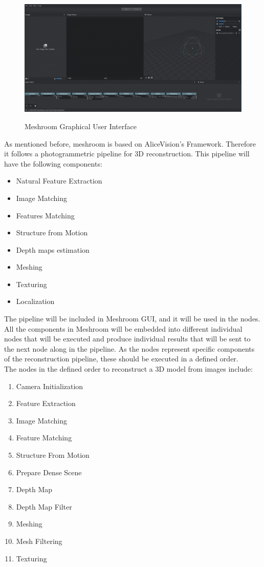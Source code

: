 \documentclass[12pt]{report}
\begin{document}
\begin{figure}[h]
  \centering
  \includegraphics[width=1\textwidth]{meshroom_gui.jpg}
  \caption{Meshroom Graphical User Interface}\cite[]{meshroom}
  \label{fig:meshroom_gui} 
\end{figure}

\newpage
As mentioned before, meshroom is based on AliceVision's Framework. Therefore it follows a photogrammetric pipeline for 3D reconstruction. 
This pipeline will have the following components:
\begin{itemize}
  \itemsep0em 
  \item Natural Feature Extraction
  \item Image Matching
  \item Features Matching
  \item Structure from Motion
  \item Depth maps estimation
  \item Meshing
  \item Texturing
  \item Localization
\end{itemize}

The pipeline will be included in Meshroom GUI, and it will be used in the nodes. All the components in Meshroom will be embedded into different individual nodes that will be executed and produce individual results that will be sent to the next node along in the pipeline.
As the nodes represent specific components of the reconstruction pipeline, these should be executed in a defined order.\\
The nodes in the defined order to reconstruct a 3D model from images include:
\begin{enumerate}
  \itemsep0em 
  \item Camera Initialization 
  \item Feature Extraction
  \item Image Matching
  \item Feature Matching
  \item Structure From Motion
  \item Prepare Dense Scene
  \item Depth Map
  \item Depth Map Filter
  \item Meshing
  \item Mesh Filtering
  \item Texturing
\end{enumerate}
\end{document}
